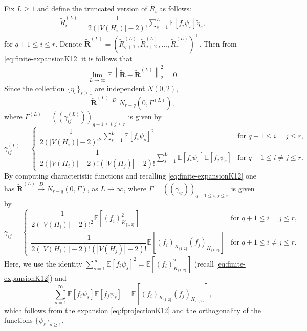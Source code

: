 \documentclass[11pt,reqno]{amsart}
\numberwithin{equation}{section}
\newcommand\dto{\overset{D}{\rightarrow}}
\theoremstyle{definition}
\begin{document}
Fix $L \geq 1$ and define the truncated version of $\tilde R_i$ as follows: 
\begin{align*}
\tilde R_i^{(L)}  = \dfrac{1}{2(|V(H_{i})|-2)!} \sum_{s = 1}^L\mathbb{E}\left[f_{i}\psi_{s}\right]\tilde \eta_{s} , 
 \end{align*} 
 for $q+1 \leq i \leq r$. Denote $\tilde{\bm R}^{(L)} = (\tilde R_{q+1}^{(L)}, \tilde R_{q+2}^{(L)}, \ldots, \tilde R_r^{(L)})^\top$. Then from \eqref{eq:finite-expansionK12} it is follows that 
\begin{align}\label{eq:L2norm-vector-convg}
  \lim_{L \rightarrow \infty}  \mathbb E \left\| \tilde{\bm R} - \tilde{\bm R}^{(L)} \right\|_{2}^{2} = 0 . 
\end{align} 
Since the collection $\{\eta_s\}_{s \geq 1}$ are independent $N(0, 2)$, 
$$\tilde{\bm R}^{(L)} \stackrel{D} = N_{r-q}(0, \Gamma^{(L)}) , $$ 
where $\Gamma^{(L)} = ((\gamma_{ij}^{(L)}))_{q+1 \leq i, j \leq r}$ is given by 
$$
\gamma_{ij}^{(L)} = 
\left\{
\begin{array}{cc} 
\dfrac{1}{2(|V(H_{i})|-2)!^2} \sum_{s = 1}^L\mathbb{E}\left[f_{i}\psi_{s}\right]^2 & \text{for } q+1 \leq i = j \leq r , \\ 
\dfrac{1}{2(|V(H_{i})|-2)! (|V(H_{j})|-2)!} \sum_{s = 1}^L\mathbb{E}\left[f_{i}\psi_{s}\right] \mathbb{E}\left[f_{j}\psi_{s}\right] & \text{for } q+1 \leq i \ne j \leq r. 
\end{array} 
\right. 
$$
By computing characteristic functions and recalling \eqref{eq:finite-expansionK12} one has $\tilde{\bm R}^{(L)} \dto N_{r-q}(0, \Gamma)$, as $L \rightarrow \infty$, where 
$\Gamma = ((\gamma_{ij}))_{q+1 \leq i, j \leq r}$ is given by 
$$
\gamma_{ij} = 
\left\{
\begin{array}{cc} 
\dfrac{1}{2(|V(H_{i})|-2)!^2}  \mathbb E[ (f_i)_{K_{\{1, 2\} }}^2 ]  & \text{for } q+1 \leq i = j \leq r , \\ 
\dfrac{1}{2(|V(H_{i})|-2)! (|V(H_{j})|-2)!} \mathbb E[ (f_i)_{K_{\{1, 2\} }} (f_j)_{K_{\{1, 2\} }} ]  & \text{for } q+1 \leq i \ne j \leq r. 
\end{array} 
\right. 
$$
Here, we use the identity 
$\sum_{s = 1}^\infty \mathbb{E}\left[f_{i}\psi_{s}\right]^2 = \mathbb E[ (f_i)_{K_{\{1, 2\}}}^2]$ (recall \eqref{eq:finite-expansionK12}) and 
$$\sum_{s = 1}^\infty \mathbb{E}\left[f_{i}\psi_{s}\right] \mathbb{E}\left[f_{j}\psi_{s}\right] = \mathbb E[ (f_i)_{K_{\{1, 2\} }} (f_j)_{K_{\{1, 2\} }} ] , $$ 
which follows from the expansion \eqref{eq:fprojectionK12} and the orthogonality of the functions $\{ \psi_s \}_{s \geq 1}$.
\end{document}
